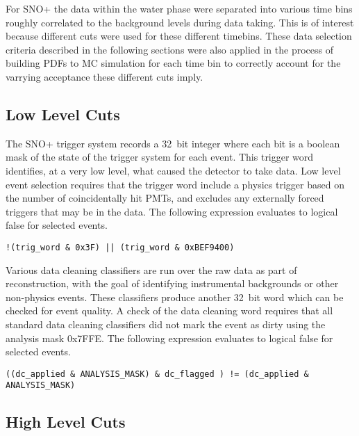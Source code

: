 For SNO+ the data within the water phase were separated into various time bins roughly correlated to the background levels during data taking.
This is of interest because different cuts were used for these different timebins.
These data selection criteria described in the following sections were also applied in the process of building PDFs to MC simulation for each time bin to correctly account for the varrying acceptance these different cuts imply.

\subsection{Low Level Cuts}

The SNO+ trigger system records a 32~bit integer where each bit is a boolean mask of the state of the trigger system for each event.
This trigger word identifies, at a very low level, what caused the detector to take data.
Low level event selection requires that the trigger word include a physics trigger based on the number of coincidentally hit PMTs, and excludes any externally forced triggers that may be in the data.
The following expression evaluates to logical false for selected events.

\begin{verbatim}
!(trig_word & 0x3F) || (trig_word & 0xBEF9400)
\end{verbatim}

Various data cleaning classifiers are run over the raw data as part of reconstruction, with the goal of identifying instrumental backgrounds or other non-physics events.
These classifiers produce another 32~bit word which can be checked for event quality.
A check of the data cleaning word requires that all standard data cleaning classifiers did not mark the event as dirty using the analysis mask 0x7FFE.
The following expression evaluates to logical false for selected events.

\begin{verbatim}
((dc_applied & ANALYSIS_MASK) & dc_flagged ) != (dc_applied & ANALYSIS_MASK)
\end{verbatim}

\subsection{High Level Cuts}

